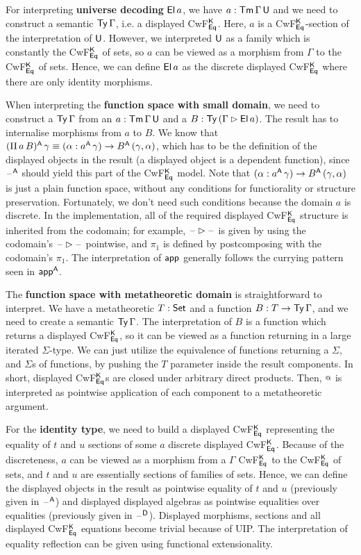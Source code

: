 \documentclass[acmsmall,review]{acmart}\settopmatter{printfolios=true,printccs=false,printacmref=false}
\begin{document}
For interpreting \textbf{universe decoding} $\mathsf{El}\,a$, we have $a :
\mathsf{Tm}\,\Gamma\,\mathsf{U}$ and we need to construct a semantic $\mathsf{Ty}\,\Gamma$,
i.e. a displayed CwF$^{\mathsf{K}}_{\mathsf{Eq}}$. Here, $a$ is a CwF$^{\mathsf{K}}_{\mathsf{Eq}}$-section
of the interpretation of $\mathsf{U}$. However, we interpreted $\mathsf{U}$ as a
family which is constantly the CwF$^{\mathsf{K}}_{\mathsf{Eq}}$ of sets, so $a$ can be
viewed as a morphism from $\Gamma$ to the CwF$^{\mathsf{K}}_{\mathsf{Eq}}$ of
sets. Hence, we can define $\mathsf{El}\,a$ as the discrete
displayed CwF$^{\mathsf{K}}_{\mathsf{Eq}}$ where there are only identity morphisms.

When interpreting the \textbf{function space with small domain}, we
need to construct a $\mathsf{Ty}\,\Gamma$ from an $a : \mathsf{Tm}\,\Gamma\,\mathsf{U}$ and a
$B : \mathsf{Ty}\,(\Gamma\rhd\mathsf{El}\,a)$. The result has to internalise morphisms
from $a$ to $B$. We know that $(\Pi\,a\,B)^{\mathsf{A}}\,\gamma \equiv
(\alpha:a^{\mathsf{A}}\,\gamma)\rightarrow B^{\mathsf{A}}\,(\gamma, \alpha)$, which has to be the
definition of the displayed objects in the result (a displayed object
is a dependent function), since $\mathord{\hspace{1pt}\text{--}\hspace{1pt}}^{\mathsf{A}}$ should yield this part of
the CwF$^{\mathsf{K}}_{\mathsf{Eq}}$ model. Note that $(\alpha:a^{\mathsf{A}}\,\gamma)\rightarrow
B^{\mathsf{A}}\,(\gamma, \alpha)$ is just a plain function space, without any
conditions for functiorality or structure preservation. Fortunately,
we don't need such conditions because the domain $a$ is discrete. In
the implementation, all of the required displayed CwF$^{\mathsf{K}}_{\mathsf{Eq}}$
structure is inherited from the codomain; for example,
$\mathord{\hspace{1pt}\text{--}\hspace{1pt}}\rhd\mathord{\hspace{1pt}\text{--}\hspace{1pt}}$ is given by using the codomain's $\mathord{\hspace{1pt}\text{--}\hspace{1pt}}\rhd\mathord{\hspace{1pt}\text{--}\hspace{1pt}}$
pointwise, and $\pi_1$ is defined by postcomposing with the codomain's
$\pi_1$. The interpretation of $\mathsf{app}$ generally follows the currying
pattern seen in $\mathsf{app}^{\mathsf{A}}$.

The \textbf{function space with metatheoretic domain} is straightforward
to interpret. We have a metatheoretic $T : \mathsf{Set}$ and a function $B : T
\rightarrow \mathsf{Ty}\,\Gamma$, and we need to create a semantic $\mathsf{Ty}\,\Gamma$. The
interpretation of $B$ is a function which returns a displayed
CwF$^{\mathsf{K}}_{\mathsf{Eq}}$, so it can be viewed as a function returning in a large
iterated $\Sigma$-type. We can just utilize the equivalence of
functions returning a $\Sigma$, and $\Sigma$s of functions, by pushing
the $T$ parameter inside the result components. In short, displayed
CwF$^{\mathsf{K}}_{\mathsf{Eq}}$s are closed under arbitrary direct products. Then,
$\mathop{{\scriptstyle @}}$ is interpreted as pointwise application of each component to a
metatheoretic argument.

For the \textbf{identity type}, we need to build a displayed
CwF$^{\mathsf{K}}_{\mathsf{Eq}}$ representing the equality of $t$ and $u$ sections of
some $a$ discrete displayed CwF$^{\mathsf{K}}_{\mathsf{Eq}}$. Because of the
discreteness, $a$ can be viewed as a morphism from a $\Gamma$
CwF$^{\mathsf{K}}_{\mathsf{Eq}}$ to the CwF$^{\mathsf{K}}_{\mathsf{Eq}}$ of sets, and $t$ and $u$ are
essentially sections of families of sets. Hence, we can define the
displayed objects in the result as pointwise equality of $t$ and $u$
(previously given in $\mathord{\hspace{1pt}\text{--}\hspace{1pt}}^{\mathsf{A}}$) and displayed displayed algebras as
pointwise equalities over equalities (previously given in
$\mathord{\hspace{1pt}\text{--}\hspace{1pt}}^{\mathsf{D}}$). Displayed morphisms, sections and all displayed
CwF$^{\mathsf{K}}_{\mathsf{Eq}}$ equations become trivial because of UIP. The
interpretation of equality reflection can be given using functional
extensionality.
\end{document}
